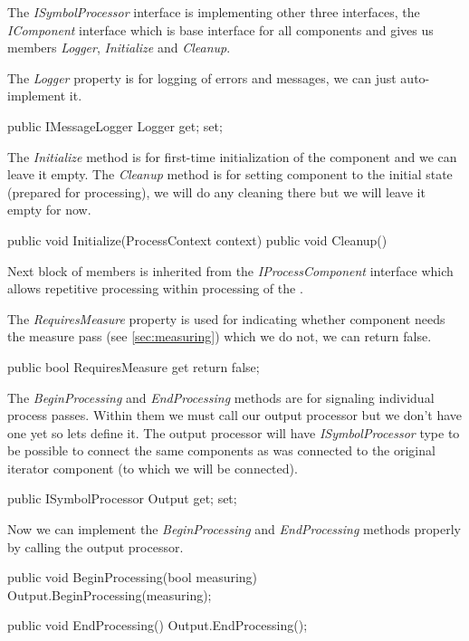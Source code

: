 The \emph{ISymbolProcessor} interface is implementing other three interfaces, the \emph{IComponent} interface which is base interface for all components and gives us members \emph{Logger}, \emph{Initialize} and \emph{Cleanup}.

The \emph{Logger} property is for logging of errors and messages, we can just auto-implement it.

\begin{Csharp}
public IMessageLogger Logger { get; set; }
\end{Csharp}

The \emph{Initialize} method is for first-time initialization of the component and we can leave it empty.
The \emph{Cleanup} method is for setting component to the initial state (prepared for processing), we will do any cleaning there but we will leave it empty for now.

\begin{Csharp}public void Initialize(ProcessContext context) { }
public void Cleanup() { }
\end{Csharp}

Next block of members is inherited from the \emph{IProcessComponent} interface which allows repetitive processing within processing of the \lsystem.

The \emph{RequiresMeasure} property is used for indicating whether component needs the measure pass (see \autoref{sec:measuring}) which we do not, we can return false.

\begin{Csharp}
public bool RequiresMeasure { get { return false; } }
\end{Csharp}

The \emph{BeginProcessing} and \emph{EndProcessing} methods are for signaling individual process passes.
Within them we must call our output processor but we don't have one yet so lets define it.
The output processor will have \emph{ISymbolProcessor} type to be possible to connect the same components as was connected to the original iterator component (to which we will be connected).

\begin{Csharp}
[UserConnectable]
public ISymbolProcessor Output { get; set; }
\end{Csharp}

Now we can implement the \emph{BeginProcessing} and \emph{EndProcessing} methods properly by calling the output processor.

\begin{Csharp}
public void BeginProcessing(bool measuring) {
	Output.BeginProcessing(measuring);
}

public void EndProcessing() {
	Output.EndProcessing();
}
\end{Csharp}

